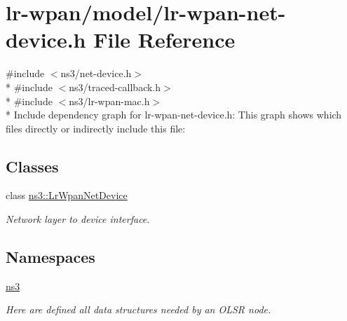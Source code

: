 \hypertarget{lr-wpan-net-device_8h}{}\section{lr-\/wpan/model/lr-\/wpan-\/net-\/device.h File Reference}
\label{lr-wpan-net-device_8h}
{\ttfamily \#include $<$ns3/net-\/device.\+h$>$}\\*
{\ttfamily \#include $<$ns3/traced-\/callback.\+h$>$}\\*
{\ttfamily \#include $<$ns3/lr-\/wpan-\/mac.\+h$>$}\\*
Include dependency graph for lr-\/wpan-\/net-\/device.h\+:
This graph shows which files directly or indirectly include this file\+:
\subsection*{Classes}
\begin{DoxyCompactItemize}
\item 
class \hyperlink{classns3_1_1LrWpanNetDevice}{ns3\+::\+Lr\+Wpan\+Net\+Device}
\begin{DoxyCompactList}\small\item\em Network layer to device interface. \end{DoxyCompactList}\end{DoxyCompactItemize}
\subsection*{Namespaces}
\begin{DoxyCompactItemize}
\item 
 \hyperlink{namespacens3}{ns3}
\begin{DoxyCompactList}\small\item\em Here are defined all data structures needed by an O\+L\+SR node. \end{DoxyCompactList}\end{DoxyCompactItemize}
